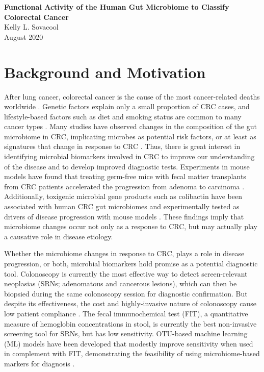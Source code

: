 \documentclass[11pt]{article}
\begin{document}
\sloppy
\begin{center}
\large{\textbf{
    Functional Activity of the Human Gut Microbiome to Classify Colorectal Cancer
}} \\
\vspace{11pt}
\small{
    Kelly L. Sovacool \\
    August 2020
}
\end{center}



\section*{Background and Motivation} %

After lung cancer, colorectal cancer is the cause of the most cancer-related deaths worldwide \cite{ferlay_cancer_2015}.
Genetic factors explain only a small proportion of CRC cases, and lifestyle-based factors such as diet and smoking status are common to many cancer types \cite{thomas_metagenomic_2019}.
Many studies have observed changes in the composition of the gut microbiome in CRC, implicating microbes as potential risk factors, or at least as signatures that change in response to CRC \cite{kostic_genomic_2012, chen_decreased_2013}.
Thus, there is great interest in identifying microbial biomarkers involved in CRC to improve our understanding of the disease and to develop improved diagnostic tests.
Experiments in mouse models have found that treating germ-free mice with fecal matter transplants from CRC patients accelerated the progression from adenoma to carcinoma \cite{li_gut_2019, sobhani_colorectal_2019}.
Additionally, toxigenic microbial gene products such as colibactin have been associated with human CRC gut microbiomes and experimentally tested as drivers of disease progression with mouse models \cite{cougnoux_bacterial_2013, gagnaire_collateral_2017, thakur_unveiling_2019}.
These findings imply that microbiome changes occur not only as a response to CRC,
but may actually play a causative role in disease etiology.

Whether the microbiome changes in response to CRC, plays a role in disease progression, or both,
microbial biomarkers hold promise as a potential diagnostic tool.
Colonoscopy is currently the most effective way to detect screen-relevant neoplasias (SRNs; adenomatous and cancerous lesions),
which can then be biopsied during the same colonoscopy session for diagnostic confirmation.
But despite its effectiveness, the cost and highly-invasive nature of colonoscopy cause low patient compliance \cite{ling_attitudes_2001, jones_patient-reported_2010}.
The fecal immunochemical test (FIT), a quantitative measure of hemoglobin concentrations in stool,
is currently the best non-invasive screening tool for SRNs, but has low sensitivity.
OTU-based machine learning (ML) models have been developed that modestly improve sensitivity when used in complement with FIT, demonstrating the feasibility of using microbiome-based markers for diagnosis \cite{baxter_microbiota-based_2016}.
\end{document}
